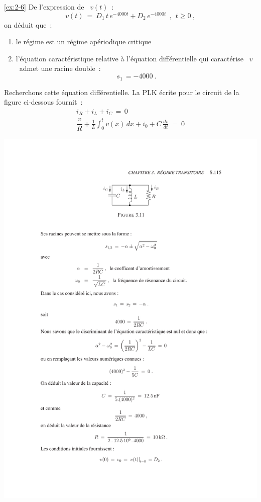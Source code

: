 \begin{solexercise}{\ref{ex:2-6}}
	\label{solex:2-6}
De l'expression de \ $v(t)$~:
\[ v(t) \: = \: D_1\, t\, e^{-4000t} + D_2\, e^{-4000t}~~, ~~t\geq 0~, \]
on d\'eduit que~:
\begin{enumerate}
	\item le r\'egime est un r\'egime ap\'eriodique critique
	\item l'\'equation caract\'eristique relative \`a l'\'equation diff\'erentielle
	qui caract\'erise \ $v$ \ admet une racine double~:
	\[ s_1 \, = -4000~. \]
\end{enumerate}
Recherchons cette \'equation diff\'erentielle.
La PLK \'ecrite pour le circuit de la figure ci-dessous fournit~:
\[ \begin{array}{c}
i_R + i_L + i_C \, = \, 0\\[3mm]
\dfrac{v}{R} + {\displaystyle \frac{1}{L}} {\displaystyle \int^t_0} v(x) \, dx 
+ i_0 + C\, {\displaystyle \frac{dv}{dt}} \: = \: 0\end{array} \]
\begin{center}
	\includegraphics[width=\linewidth]{sol_exercices/ex3-6}
\end{center}


\end{solexercise}
